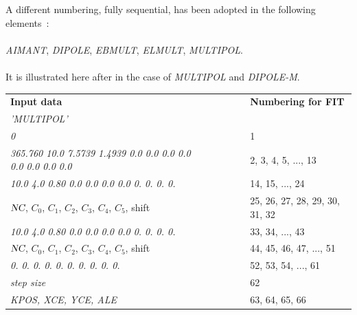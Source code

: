 \bigskip

\noindent A different numbering,  fully sequential, has been adopted in the following elements~: \\
\\
 \textsl{AIMANT},   \textsl{DIPOLE}, 
 \textsl{EBMULT}, \textsl{ELMULT}, \textsl{MULTIPOL}. \\
\\
It is  illustrated  here after 
in the case of \textsl{MULTIPOL} and \textsl{DIPOLE-M}. 

\begin{center}
{\renewcommand{\arraystretch}{1}
	\begin{tabular}{lcl}
	\textbf{Input  data}  &~~~~~~~~&  \textbf{Numbering  for  FIT}\\
      \textsl{'MULTIPOL'}                      \\
	\textsl{0 }     &  &  1 \\
	\textsl{365.760 10.0 7.5739 1.4939 0.0 0.0 0.0 0.0 0.0 0.0 0.0 0.0} &&  2, 3, 4, 5, ..., 13    \\
	\textsl{10.0  4.0  0.80 0.0 0.0 0.0 0.0 0. 0. 0. 0. }     &&  14, 15, ..., 24       \\
	$\textsl{NC}$, $C_0$, $C_1$, $C_2$, $C_3$, $C_4$, $C_5$, shift &&  25, 26, 27, 28, 29, 30, 31, 32  \\
	\textsl{10.0  4.0  0.80 0.0 0.0 0.0 0.0 0. 0. 0. 0. }     &&  33, 34, ..., 43       \\
	$\textsl{NC}$, $C_0$, $C_1$, $C_2$, $C_3$, $C_4$, $C_5$, shift &&  44, 45, 46, 47, ...,    51    \\
	\textsl{0. 0. 0. 0. 0. 0. 0. 0. 0. 0.  }     &&  52, 53, 54, ..., 61   \\
	\textsl{ step size }     && 62    \\
	\textsl{ KPOS, XCE, YCE, ALE }     && 63, 64, 65, 66    \\
	\end{tabular}   }
\end{center}

\newpage

